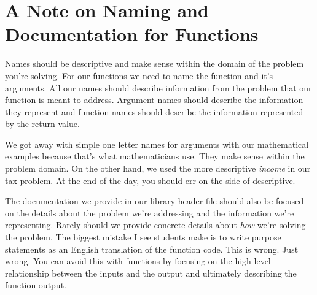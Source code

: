 \documentclass[]{tufte-handout}
\begin{document}
\section{A Note on Naming and Documentation for Functions}

Names should be descriptive and make sense within the domain of the problem you're solving. For our functions we need to name the function and it's arguments.  All our names should describe information from the problem that our function is meant to address. Argument names should describe the information they represent and function names should describe the information represented by the return value.

We got away with simple one letter names for arguments with our mathematical examples because that's what mathematicians use.  They make sense within the problem domain.  On the other hand, we used the more descriptive \textit{income} in our tax problem.  At the end of the day, you should err on the side of descriptive.

The documentation we provide in our library header file should also be focused on the details about the problem we're addressing and the information we're representing. Rarely should we provide concrete details about \textit{how} we're solving the problem.  The biggest mistake I see students make is to write purpose statements as an English translation of the function code. This is wrong. Just wrong. You can avoid this with functions by focusing on the high-level relationship between the inputs and the output and ultimately describing the function output.
\end{document}
